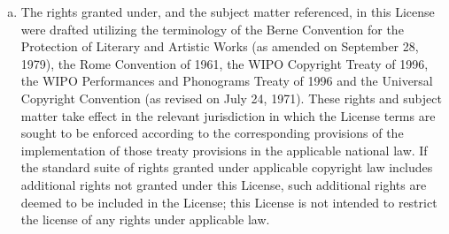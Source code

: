\begin{enumerate}[a.]
          \item The rights granted under, and the subject matter
          referenced, in this License were drafted utilizing the
          terminology of the Berne Convention for the Protection of
          Literary and Artistic Works (as amended on September 28,
          1979), the Rome Convention of 1961, the WIPO Copyright
          Treaty of 1996, the WIPO Performances and Phonograms
          Treaty of 1996 and the Universal Copyright Convention (as
          revised on July 24, 1971). These rights and subject
          matter take effect in the relevant jurisdiction in which
          the License terms are sought to be enforced according to
          the corresponding provisions of the implementation of
          those treaty provisions in the applicable national law.
          If the standard suite of rights granted under applicable
          copyright law includes additional rights not granted
          under this License, such additional rights are deemed to
          be included in the License; this License is not intended
          to restrict the license of any rights under applicable
          law.
\end{enumerate}


